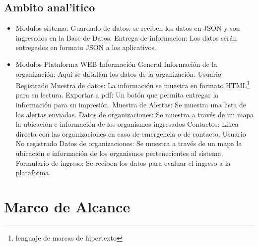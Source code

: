 \documentclass[letterpaper,openright,10pt,oneside]{report}
\begin{document}
			\subsection{Ambito anal'itico}
			\begin{itemize}
				\item Modulos sistema:
					\subitem Guardado de datos: se reciben los datos en JSON y son ingresados en la Base de Datos.
					\subitem Entrega de informacion: Los datos serán entregados en formato JSON a los aplicativos.
				\item Modulos Plataforma WEB
					\subitem Información General
						\subsubitem Información de la organización: Aquí se datallan los datos de la organización.
					\subitem Usuario Registrado
						\subsubitem Muestra de datos: La información se muestra en formato HTML\footnote{lenguaje de marcas de hipertexto} para su lectura.
						\subsubitem Exportar a pdf: Un botón que permita entregar la información para su impresión.
						\subsubitem Muestra de Alertas: Se muestra una lista de las alertas enviadas.
						\subsubitem Datos de organizaciones: Se muestra a través de un mapa la ubicación e información de los organismos ingresados
						\subsubitem Contactos: Linea directa con las organizaciones en caso de emergencia o de contacto.
					\subitem Usuario No registrado
						\subsubitem Datos de organizaciones: Se muestra a través de un mapa la ubicación e información de los organismos pertenecientes al sistema.
						\subsubitem Formulario de ingreso: Se reciben los datos para evaluar el ingreso a la plataforma.
						
					
\end{itemize}
		\section{Marco de Alcance}
\end{document}
